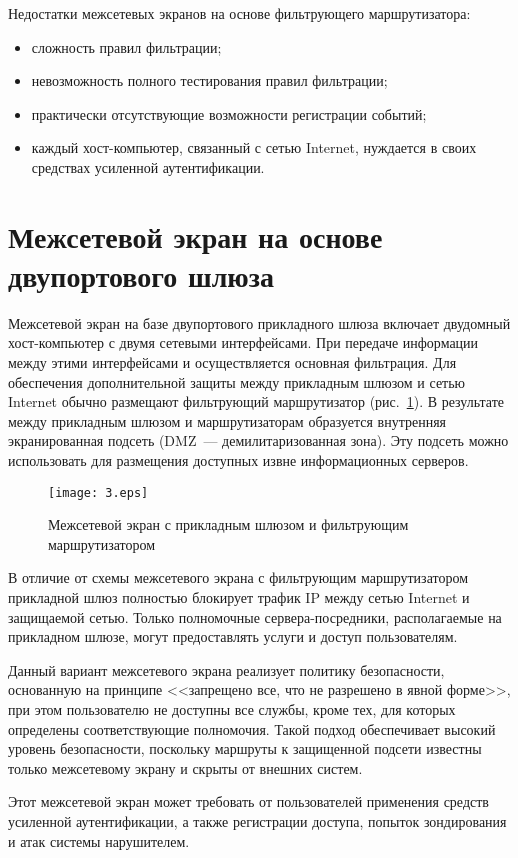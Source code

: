 Недостатки межсетевых экранов на основе фильтрующего маршрутизатора:
\begin{itemize}
\item  сложность правил фильтрации;
\item  невозможность полного тестирования правил фильтрации;
\item  практически отсутствующие возможности регистрации событий;
\item  каждый хост-компьютер, связанный с сетью Internet,
    нуждается в своих средствах усиленной аутентификации.
\end{itemize}

\section{Межсетевой экран на основе двупортового шлюза}
Межсетевой экран на базе двупортового прикладного шлюза включает
двудомный хост-компьютер с двумя сетевыми интерфейсами. При передаче
информации между этими интерфейсами и осуществляется основная
фильтрация. Для обеспечения дополнительной защиты между прикладным
шлюзом и сетью Internet обычно размещают фильтрующий маршрутизатор
(рис.~\ref{fig:gor:3}). В результате между прикладным шлюзом и маршрутизаторам
образуется внутренняя экранированная подсеть (DMZ~--- демилитаризованная
зона). Эту подсеть можно использовать для размещения доступных извне
информационных серверов.

\begin{figure}[!htp]
\centerline{\texttt{[image: 3.eps]}}
\caption{Межсетевой экран с прикладным шлюзом и фильтрующим маршрутизатором}
\label{fig:gor:3}
\end{figure}


В отличие от схемы межсетевого экрана с фильтрующим маршрутизатором
прикладной шлюз полностью блокирует трафик IP между сетью Internet и
защищаемой сетью. Только полномочные сервера-посредники, располагаемые
на прикладном шлюзе, могут предоставлять услуги и доступ
пользователям.

Данный вариант межсетевого экрана реализует политику безопасности,
основанную на принципе <<запрещено все, что не разрешено в явной
форме>>, при этом пользователю не доступны все службы, кроме тех, для
которых определены соответствующие полномочия. Такой подход
обеспечивает высокий уровень безопасности, поскольку маршруты к
защищенной подсети известны только межсетевому экрану и скрыты от
внешних систем.

Этот межсетевой экран может требовать от пользователей применения
средств усиленной аутентификации, а также регистрации доступа, попыток
зондирования и атак системы нарушителем.

